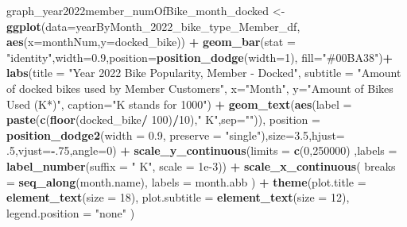 \documentclass[
]{article}
\newenvironment{Shaded}{\begin{snugshade}}{\end{snugshade}}
\newcommand{\AttributeTok}[1]{\textcolor[rgb]{0.13,0.29,0.53}{#1}}
\newcommand{\DecValTok}[1]{\textcolor[rgb]{0.00,0.00,0.81}{#1}}
\newcommand{\FloatTok}[1]{\textcolor[rgb]{0.00,0.00,0.81}{#1}}
\newcommand{\FunctionTok}[1]{\textcolor[rgb]{0.13,0.29,0.53}{\textbf{#1}}}
\newcommand{\NormalTok}[1]{#1}
\newcommand{\OtherTok}[1]{\textcolor[rgb]{0.56,0.35,0.01}{#1}}
\newcommand{\SpecialCharTok}[1]{\textcolor[rgb]{0.81,0.36,0.00}{\textbf{#1}}}
\newcommand{\StringTok}[1]{\textcolor[rgb]{0.31,0.60,0.02}{#1}}
\begin{document}
\begin{Shaded}
\begin{Highlighting}[]
\NormalTok{graph\_year2022member\_numOfBike\_month\_docked }\OtherTok{\textless{}{-}} \FunctionTok{ggplot}\NormalTok{(}\AttributeTok{data=}\NormalTok{yearByMonth\_2022\_bike\_type\_Member\_df, }\FunctionTok{aes}\NormalTok{(}\AttributeTok{x=}\NormalTok{monthNum,}\AttributeTok{y=}\NormalTok{docked\_bike)) }\SpecialCharTok{+}
  \FunctionTok{geom\_bar}\NormalTok{(}\AttributeTok{stat =} \StringTok{"identity"}\NormalTok{,}\AttributeTok{width=}\FloatTok{0.9}\NormalTok{,}\AttributeTok{position=}\FunctionTok{position\_dodge}\NormalTok{(}\AttributeTok{width=}\DecValTok{1}\NormalTok{), }\AttributeTok{fill=}\StringTok{"\#00BA38"}\NormalTok{)}\SpecialCharTok{+}
  \FunctionTok{labs}\NormalTok{(}\AttributeTok{title =} \StringTok{"Year 2022 Bike Popularity, Member {-} Docked"}\NormalTok{,}
       \AttributeTok{subtitle =} \StringTok{"Amount of docked bikes used by Member Customers"}\NormalTok{,}
       \AttributeTok{x=}\StringTok{"Month"}\NormalTok{,}
       \AttributeTok{y=}\StringTok{"Amount of Bikes Used (K*)"}\NormalTok{,}
       \AttributeTok{caption=}\StringTok{"K stands for 1000"}\NormalTok{) }\SpecialCharTok{+}
  \FunctionTok{geom\_text}\NormalTok{(}\FunctionTok{aes}\NormalTok{(}\AttributeTok{label =} \FunctionTok{paste}\NormalTok{(}\FunctionTok{c}\NormalTok{(}\FunctionTok{floor}\NormalTok{(docked\_bike}\SpecialCharTok{/} \DecValTok{100}\NormalTok{)}\SpecialCharTok{/}\DecValTok{10}\NormalTok{),}\StringTok{" K"}\NormalTok{,}\AttributeTok{sep=}\StringTok{""}\NormalTok{)),}
            \AttributeTok{position =} \FunctionTok{position\_dodge2}\NormalTok{(}\AttributeTok{width =} \FloatTok{0.9}\NormalTok{, }\AttributeTok{preserve =} \StringTok{"single"}\NormalTok{),}\AttributeTok{size=}\FloatTok{3.5}\NormalTok{,}\AttributeTok{hjust=}\NormalTok{ .}\DecValTok{5}\NormalTok{,}\AttributeTok{vjust=}\SpecialCharTok{{-}}\NormalTok{.}\DecValTok{75}\NormalTok{,}\AttributeTok{angle=}\DecValTok{0}\NormalTok{) }\SpecialCharTok{+}
  \FunctionTok{scale\_y\_continuous}\NormalTok{(}\AttributeTok{limits =} \FunctionTok{c}\NormalTok{(}\DecValTok{0}\NormalTok{,}\DecValTok{250000}\NormalTok{) ,}\AttributeTok{labels =} \FunctionTok{label\_number}\NormalTok{(}\AttributeTok{suffix =} \StringTok{" K"}\NormalTok{, }\AttributeTok{scale =} \FloatTok{1e{-}3}\NormalTok{)) }\SpecialCharTok{+}
  \FunctionTok{scale\_x\_continuous}\NormalTok{(}
    \AttributeTok{breaks =} \FunctionTok{seq\_along}\NormalTok{(month.name), }
    \AttributeTok{labels =}\NormalTok{ month.abb}
\NormalTok{  ) }\SpecialCharTok{+}
  \FunctionTok{theme}\NormalTok{(}\AttributeTok{plot.title =} \FunctionTok{element\_text}\NormalTok{(}\AttributeTok{size =} \DecValTok{18}\NormalTok{),}
        \AttributeTok{plot.subtitle =} \FunctionTok{element\_text}\NormalTok{(}\AttributeTok{size =} \DecValTok{12}\NormalTok{),}
        \AttributeTok{legend.position =} \StringTok{"none"}
\NormalTok{  ) }



\end{Highlighting}
\end{Shaded}
\end{document}
